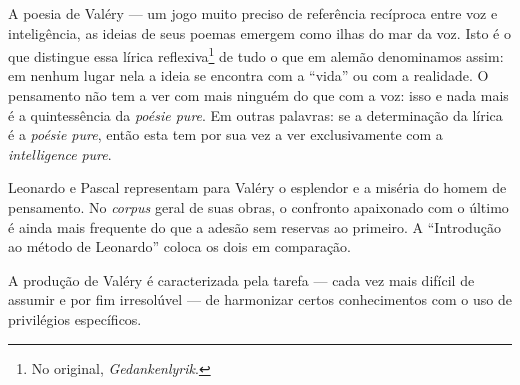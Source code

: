 A poesia de Valéry --- um jogo muito preciso de referência recíproca entre
voz e inteligência, as ideias de seus poemas emergem como ilhas do mar
da voz. Isto é o que distingue essa lírica reflexiva\footnote{No
  original, \emph{Gedankenlyrik}. \versal{[N. T.]}} de tudo o que em alemão denominamos
assim: em nenhum lugar nela a ideia se encontra com a ``vida'' ou com a
realidade. O pensamento não tem a ver com mais ninguém do que com a voz:
isso e nada mais é a quintessência da \emph{poésie pure}. Em outras
palavras: se a determinação da lírica é a \emph{poésie pure}, então esta
tem por sua vez a ver exclusivamente com a \emph{intelligence}
\emph{pure}.

Leonardo e Pascal representam para Valéry o esplendor e a miséria do
homem de pensamento. No \emph{corpus} geral de suas obras, o confronto
apaixonado com o último é ainda mais frequente do que a adesão sem
reservas ao primeiro. A ``Introdução ao método de Leonardo'' coloca os
dois em comparação.

A produção de Valéry é caracterizada pela tarefa --- cada vez mais
difícil de assumir e por fim irresolúvel --- de harmonizar certos
conhecimentos com o uso de privilégios específicos.
